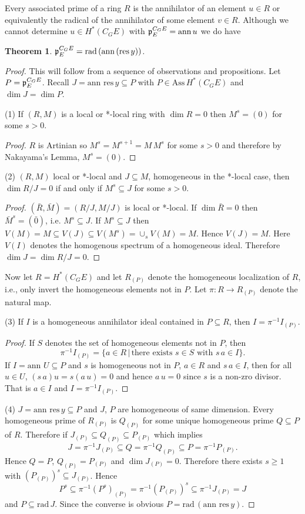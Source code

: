 \documentclass[reqno]{amsart}
\theoremstyle{plain}%
\newtheorem{thm}{Theorem}[section]
\theoremstyle{definition}
\theoremstyle{remark}
\newcommand\vv{\,\vert\,}
\newcommand\sub{\subseteq}
\newcommand\an{\text{ann}\,}
\newcommand\res{\text{res}}
\begin{document}
Every associated prime of a ring $R$ is the annihilator of an element $u\in R$ or equivalently the radical of the annihilator of some element $v\in R$.  Although we cannot determine $u\in H^*(C_GE)$ with $\frak p^{C_GE}_E=\an u$ we do have
\begin{thm} $\frak p^{C_GE}_E=\text{rad}\,(\an(\res\,y))$. \end{thm}
\begin{proof} This will follow from a sequence of observations and propositions.  Let $P=\frak p^{C_GE}_E$.  Recall $J=\an\,\res\,y\sub P$ with $P\in \text{Ass}\,H^*(C_GE)$ and $\dim J=\dim P$.
\medskip
\par (1) If $(R,M)$ is a local or *-local ring with $\dim R=0$ then $M^s=(0)$ for some $s>0$.
\begin{proof} $R$ is Artinian so $M^s=M^{s+1}=M\, M^s$ for some $s>0$ and therefore by Nakayama's Lemma, $M^s=(0)$.\end{proof}

\par (2) $(R,M)$ local or *-local and $J\sub M$, homogeneous in the *-local case, then $\dim R/J=0$ if and only if $M^s\sub J$ for some $s>0$.
\begin{proof} $(\bar R,\bar M)=(R/J, M/J)$ is local or *-local.  If $\dim\bar R=0$ then $\bar M^s=(\bar 0)$, i.e. $M^s\sub J$.  If $M^s\sub J$ then $V(M)={M}\sub V(J)\sub V(M^s)=\cup_sV(M)={M}$.  Hence $V(J)={M}$. Here $V(I)$ denotes the homogenous spectrum of a homogeneous ideal. Therefore $\dim J=\dim R/J=0$. \end{proof}

Now let $R=H^*(C_GE)$ and let $R_{(P)}$ denote the homogeneous localization of $R$, i.e., only invert the homogeneous elements not in $P$.  Let $\pi:R\to R_{(P)}$ denote the natural map.

\par (3) If $I$ is a homogeneous annihilator ideal contained in $P\sub R$, then $I=\pi^{-1}I_{(P)}$.
\begin{proof} If $S$ denotes the set of homogeneous elements not in $P$, then  
$$ \pi^{-1}I_{(P)}=\{a\in R\vv \text{there exists } s\in S\text{ with }s\,a\in I \}.$$ If $I=\an\,U\sub P$ and $s$ is homogeneous not in $P$, $a\in R$ and $s\,a\in I$, then for all $u\in U$, $(s\,a)u=s(a\,u)=0$ and hence $a\,u=0$ since $s$ is a non-zro divisor. That is $a\in I$ and $I=\pi^{-1}I_{(P)}$. \end{proof}

\par (4) $J=\an\,\res\,y\sub P$ and $J$, $P$ are homogeneous of same dimension. Every homogeneous prime of $R_{(P)}$ is $Q_{(P)}$ for some unique homogeneous prime $Q\sub P$ of $R$.  Therefore if $J_{(P)}\sub Q_{(P)}\sub P_{(P)}$ which implies
$$ J=\pi^{-1}J_{(P)}\sub Q=\pi^{-1} Q_{(P)}\sub P=\pi^{-1} P_{(P)}.$$
Hence $Q=P$, $Q_{(P)}=P_{(P)}$ and $\dim J_{(P)}=0$.  Therefore there exists $s\geq 1$ with $(P_{(P)})^s\sub J_{(P)}$.
Hence $$ P^s\sub \pi^{-1}(P^s)_{(P)}= \pi^{-1}(P_{(P)})^s\sub \pi^{-1}J_{(P)}=J $$
and $P\sub\text{rad}\,J$. Since the converse is obvious $P=\text{rad}\,(\an\,\res\,y)$.
\end{proof}
\end{document}
